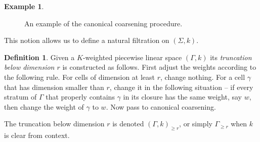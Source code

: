 \documentclass[11pt]{amsart}
\theoremstyle{definition}
\theoremstyle{definition}
\newtheorem{definition}[theorem]{Definition}
\newtheorem{example}[theorem]{Example}
\begin{document}
\begin{example}
\begin{figure}[h!]
\caption{An example of the canonical coarsening procedure.}\label{fig: canonical-coarsening}
\end{figure}

\end{example}



This notion allows us to define a natural filtration on $(\Sigma,k)$.  

\begin{definition}
Given a $K$-weighted piecewise linear space $(\Gamma,k)$ its {\it truncation below dimension $r$} is constructed as follows. First adjust the weights according to the following rule. For cells of dimension at least $r$, change nothing. For a cell $\gamma$ that has dimension smaller than $r$, change it in the following situation -- if every stratum of $\Gamma$ that properly contains $\gamma$ in its closure has the same weight, say $w$, then change the weight of $\gamma$ to $w$. Now pass to canonical coarsening.

The truncation below dimension $r$ is denoted $(\Gamma,k)_{\geq r}$, or simply $\Gamma_{\geq r}$ when $k$ is clear from context. 
\end{definition}
\end{document}
